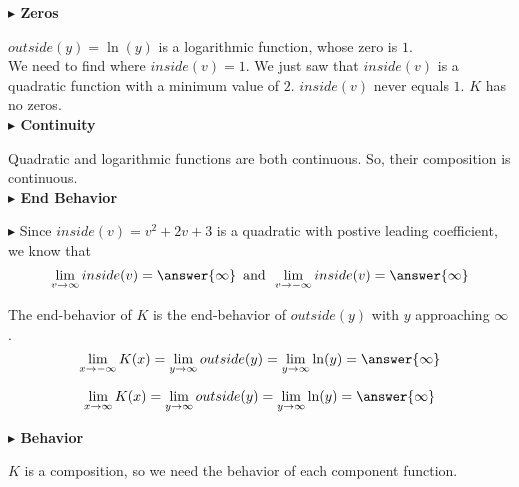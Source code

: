 \documentclass{ximera}
\begin{document}
\begin{example}
\textbf{\textcolor{blue!55!black}{$\blacktriangleright$ Zeros}} 


$outside(y) = \ln(y)$ is a logarithmic function, whose zero is $1$. \\

We need to find where $inside(v) = 1$. We just saw that $inside(v)$ is a quadratic function with a minimum value of $2$.  $inside(v)$ never equals $1$.  $K$ has no zeros. \\






\textbf{\textcolor{blue!55!black}{$\blacktriangleright$ Continuity}} 


Quadratic and logarithmic functions are both continuous. So, their composition is continuous. \\




\textbf{\textcolor{blue!55!black}{$\blacktriangleright$ End Behavior}} 






$\blacktriangleright$ Since $inside(v) = v^2 + 2v + 3$ is a quadratic with postive leading coefficient, we know that 
\[  \lim\limits_{v \to \infty}inside(v) = \answer{\infty}  \, \text{ and } \,  \lim\limits_{v \to -\infty}inside(v) = \answer{\infty}  \]


The end-behavior of $K$ is the end-behavior of $outside(y)$ with $y$ approaching $\infty $. \\



\[  
\lim\limits_{x \to -\infty}K(x) =  \lim\limits_{y \to \infty}outside(y) =   \lim\limits_{y \to \infty}\ln(y) =  \answer{\infty}
\]





\[  
\lim\limits_{x \to \infty}K(x) =  \lim\limits_{y \to \infty}outside(y) =   \lim\limits_{y \to \infty}\ln(y) =  \answer{\infty}
\]












\textbf{\textcolor{blue!55!black}{$\blacktriangleright$ Behavior}} 


$K$ is a composition, so we need the behavior of each component function. \\





\end{example}
\end{document}
